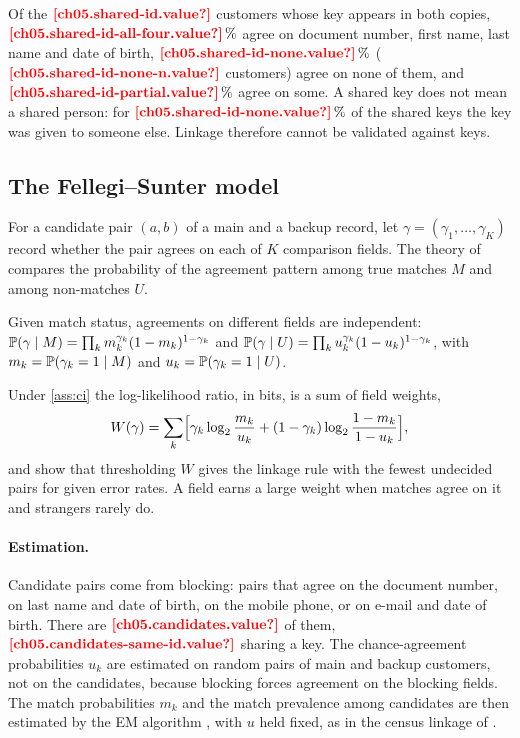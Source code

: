 Of the $\est{ch05.shared-id}{value}$ customers whose key appears in both copies,
$\est{ch05.shared-id-all-four}{value}\,\%$ agree on document number, first name, last name and date of birth,
$\est{ch05.shared-id-none}{value}\,\%$ ($\est{ch05.shared-id-none-n}{value}$ customers) agree on none of them, and
$\est{ch05.shared-id-partial}{value}\,\%$ agree on some. A shared key does not mean a shared person: for
$\est{ch05.shared-id-none}{value}\,\%$ of the shared keys the key was given to someone else. Linkage therefore cannot be validated against keys.

\subsection{The Fellegi--Sunter model}

For a candidate pair $(a, b)$ of a main and a backup record, let $\gamma = (\gamma_1, \dots, \gamma_K)$ record whether
the pair agrees on each of $K$ comparison fields. The theory of \textcite{fellegi1969} compares the probability of the
agreement pattern among true matches $M$ and among non-matches $U$.

\begin{assumption}\label{ass:ci}
Given match status, agreements on different fields are independent:
$\mathbb{P}(\gamma \mid M) = \prod_k m_k^{\gamma_k}(1 - m_k)^{1 - \gamma_k}$ and
$\mathbb{P}(\gamma \mid U) = \prod_k u_k^{\gamma_k}(1 - u_k)^{1 - \gamma_k}$, with $m_k = \mathbb{P}(\gamma_k = 1 \mid M)$ and
$u_k = \mathbb{P}(\gamma_k = 1 \mid U)$.
\end{assumption}

Under \cref{ass:ci} the log-likelihood ratio, in bits, is a sum of field weights,
\begin{equation}\label{eq:fs-weight}
  W(\gamma) = \sum_{k} \Bigl[\gamma_k \log_2 \frac{m_k}{u_k} + (1 - \gamma_k) \log_2 \frac{1 - m_k}{1 - u_k}\Bigr],
\end{equation}
and \textcite{fellegi1969} show that thresholding $W$ gives the linkage rule with the fewest undecided pairs for given
error rates. A field earns a large weight when matches agree on it and strangers rarely do.

\paragraph{Estimation.} Candidate pairs come from blocking: pairs that agree on the document number, on last name and
date of birth, on the mobile phone, or on e-mail and date of birth. There are $\est{ch05.candidates}{value}$ of them,
$\est{ch05.candidates-same-id}{value}$ sharing a key. The chance-agreement probabilities $u_k$ are estimated on random
pairs of main and backup customers, not on the candidates, because blocking forces agreement on the blocking fields.
The match probabilities $m_k$ and the match prevalence among candidates are then estimated by the EM algorithm
\autocite{dempster1977}, with $u$ held fixed, as in the census linkage of \textcite{jaro1989}.

